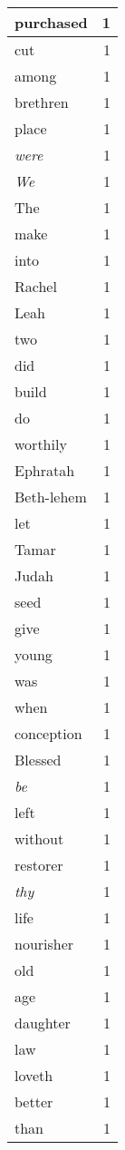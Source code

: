 \begin{center}
\begin{longtable}{l|r}
purchased & 1 \\ \hline
cut & 1 \\ \hline
among & 1 \\ \hline
brethren & 1 \\ \hline
place & 1 \\ \hline
\emph{were} & 1 \\ \hline
\emph{We} & 1 \\ \hline
The & 1 \\ \hline
make & 1 \\ \hline
into & 1 \\ \hline
Rachel & 1 \\ \hline
Leah & 1 \\ \hline
two & 1 \\ \hline
did & 1 \\ \hline
build & 1 \\ \hline
do & 1 \\ \hline
worthily & 1 \\ \hline
Ephratah & 1 \\ \hline
Beth-lehem & 1 \\ \hline
let & 1 \\ \hline
Tamar & 1 \\ \hline
Judah & 1 \\ \hline
seed & 1 \\ \hline
give & 1 \\ \hline
young & 1 \\ \hline
was & 1 \\ \hline
when & 1 \\ \hline
conception & 1 \\ \hline
Blessed & 1 \\ \hline
\emph{be} & 1 \\ \hline
left & 1 \\ \hline
without & 1 \\ \hline
restorer & 1 \\ \hline
\emph{thy} & 1 \\ \hline
life & 1 \\ \hline
nourisher & 1 \\ \hline
old & 1 \\ \hline
age & 1 \\ \hline
daughter & 1 \\ \hline
law & 1 \\ \hline
loveth & 1 \\ \hline
better & 1 \\ \hline
than & 1 \\ \hline

\end{longtable}
\end{center}
